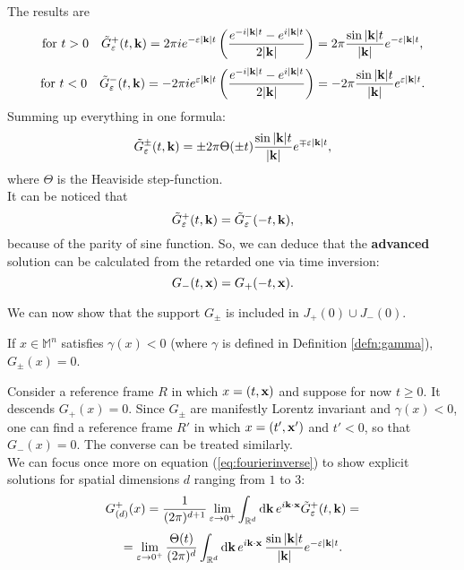 The results are 
\[	\text{for } t>0\quad \tilde{G}_\varepsilon^{+}(t,\mathbf{k})=2\pi ie^{-\varepsilon|\mathbf{k}| t}\left(\frac{e^{-i|\mathbf{k}|t}-e^{i|\mathbf{k}|t}}{2|\mathbf{k}|}\right)=2\pi \frac{\sin|\mathbf{k}|t}{|\mathbf{k}|}e^{-\varepsilon|\mathbf{k}| t},		\]
\[	\text{for } t<0\quad \tilde{G}_\varepsilon^{-}(t,\mathbf{k})=-2\pi ie^{\varepsilon|\mathbf{k}| t}\left(\frac{e^{-i|\mathbf{k}|t}-e^{i|\mathbf{k}|t}}{2|\mathbf{k}|}\right)=-2\pi \frac{\sin|\mathbf{k}|t}{|\mathbf{k}|}e^{\varepsilon|\mathbf{k}| t}.		\]
Summing up everything in one formula:
\begin{equation}
	\tilde{G}_\varepsilon^{\pm}(t,\mathbf{k})=\pm 2\pi\Theta(\pm t)\frac{\sin|\mathbf{k}|t}{|\mathbf{k}|}e^{\mp\varepsilon|\mathbf{k}| t},
	\label{eq:integralone}
\end{equation}
where $\Theta$ is the Heaviside step-function.\\
It can be noticed that
\[	\tilde{G}_\varepsilon^{+}(t,\mathbf{k})=\tilde{G}_\varepsilon^{-}(-t,\mathbf{k}),		\]
because of the parity of sine function. So, we can deduce that the \textbf{advanced} solution can be calculated from the retarded one via time inversion:
\begin{equation}
	G_-(t,\mathbf{x})=G_+(-t,\mathbf{x}).
\end{equation}

\noindent We can now show that the support $G_\pm$ is included in $J_+(0)\cup J_-(0)$.
\begin{prop}
	If $x\in\mathbb{M}^n$ satisfies $\gamma(x)<0$ (where $\gamma$ is defined in Definition \ref{defn:gamma}), $G_\pm(x)=0$.
	\label{prop:spacelike}
\end{prop}
\Proof Consider a reference frame $R$ in which $x=(t,\mathbf{x})$ and suppose for now $t\geq 0$. It descends $G_+(x)=0$.  Since $G_\pm$ are manifestly Lorentz invariant and $\gamma(x)<0$, one can find a reference frame $R'$ in which $x=(t',\mathbf{x}')$ and $t'<0$, so that $G_-(x)=0$. The converse can be treated similarly. \endproof\\

\noindent We can focus once more on equation (\ref{eq:fourierinverse}) to show explicit solutions for spatial dimensions $d$ ranging from $1$ to $3$:
\begin{equation*}
	G_{(d)}^{+}(x)=\frac1{(2\pi)^{d+1}}\lim_{\varepsilon\to 0^+}\int_{{\mathbb R}^{d}}\mathrm d\mathbf{k}\,e^{i\mathbf{k}\cdot\mathbf{x}}\tilde{G}_\varepsilon^{+}(t,\mathbf{k})=\end{equation*} 
	\begin{equation*}
	=\lim_{\varepsilon\to 0^+}\frac{\Theta(t)}{(2\pi)^{d}}\int_{{\mathbb R}^{d}}\mathrm d\mathbf{k}\,e^{i\mathbf{k}\cdot\mathbf{x}}\, \frac{\sin|\mathbf{k}|t}{|\mathbf{k}|}e^{-\varepsilon|\mathbf{k}| t}.
\end{equation*}

